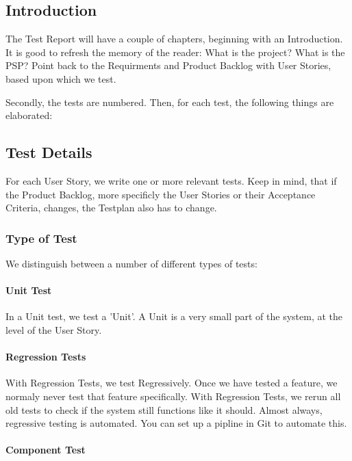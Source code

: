 \documentclass[10pt]{report}
\begin{document}
\subsection{Introduction}

The Test Report will have a couple of chapters, beginning with an Introduction. It is good to refresh the memory of the reader: What is the project? What is the PSP? Point back to the Requirments and Product Backlog with User Stories, based upon which we test.

Secondly, the tests are numbered. Then, for each test, the following things are elaborated:

\subsection{Test Details}

For each User Story, we write one or more relevant tests. Keep in mind, that if the Product Backlog, more specificly the User Stories or their Acceptance Criteria, changes, the Testplan also has to change. 

\subsubsection{Type of Test}
We distinguish between a number of different types of tests:

\paragraph{Unit Test}

In a Unit test, we test a 'Unit'. A Unit is a very small part of the system, at the level of the User Story.

\paragraph{Regression Tests}

With Regression Tests, we test Regressively. Once we have tested a feature, we normaly never test that feature specifically. With Regression Tests, we rerun all old tests to check if the system still functions like it should. Almost always, regressive testing is automated. You can set up a pipline in Git to automate this.

\paragraph{Component Test}
\end{document}
